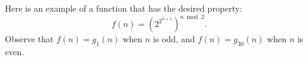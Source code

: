 Here is an example of a function that has the desired property:
\[
    f(n) = \left(2^{2^{n+1}}\right)^{n\bmod2}.
\]
Observe that $f(n)=g_1(n)$ when $n$ is odd, and $f(n)=g_{30}(n)$ when $n$ is even.
